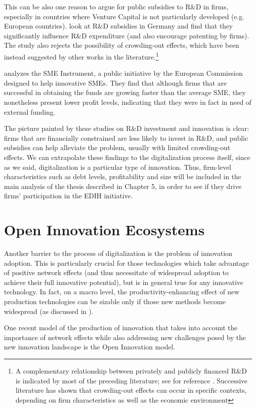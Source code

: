 \documentclass[12pt]{report}
\begin{document}
\par This can be also one reason to argue for public subsidies to R\&D in firms, especially in countries where Venture Capital is not particularly developed (e.g. European countries). \cite{Czarnitzki2004} look at R\&D subsidies in Germany and find that they significantly influence R\&D expenditure (and also encourage patenting by firms). The study also rejects the possibility of crowding-out effects, which have been instead suggested by other works in the literature.\footnote{A complementary relationship between privately and publicly financed R\&D is indicated by most of the preceding literature; see for reference \cite{david2000}. Successive literature has shown that crowding-out effects can occur in specific contexts, depending on firm characteristics as well as the economic environment}

\par \cite{mina2021} analyzes the SME Instrument, a public initiative by the European Commission designed to help innovative SMEs. They find that although firms that are successful in obtaining the funds are growing faster than the average SME, they nonetheless present lower profit levels, indicating that they were in fact in need of external funding.

\par The picture painted by these studies on R\&D investment and innovation is clear: firms that are financially constrained are less likely to invest in R\&D, and public subsidies can help alleviate the problem, usually with limited crowding-out effects. We can extrapolate these findings to the digitalization process itself, since as we said, digitalization is a particular type of innovation. Thus, firm-level characteristics such as debt levels, profitability and size will be included in the main analysis of the thesis described in Chapter 5, in order to see if they drive firms' participation in the EDIH initiative.






\section{Open Innovation Ecosystems}
\par Another barrier to the process of digitalization is the problem of innovation adoption. This is particularly crucial for those technologies which take advantage of positive network effects (and thus necessitate of widespread adoption to achieve their full innovative potential), but is in general true for any innovative technology. In fact, on a macro level, the productivity-enhancing effect of new production technologies can be sizable only if those new methods become widespread (as discussed in \cite{Juhasz2024}).
\par One recent model of the production of innovation that takes into account the importance of network effects while also addressing new challenges posed by the new innovation landscape is the Open Innovation model.
\end{document}
